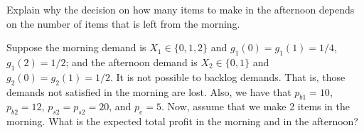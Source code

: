 \begin{exercise}
Explain why the decision on how many items to make in the afternoon depends on the number of items that is left from the morning. 

\end{exercise}


\begin{exercise}
Suppose the morning demand is $X_1\in \{0,1,2\}$ and $g_1(0)=g_1(1)=1/4$, $g_1(2)=1/2$; and the afternoon demand is $X_2\in \{0,1\}$ and $g_2(0)=g_2(1)=1/2$. It is not possible to backlog demands. That is, those demands not satisfied in the morning are lost. Also, we have that $p_{b1}=10$, $p_{b2}=12$, $p_{s2}=p_{s2}=20$, and $p_e=5$. Now, assume that we make 2 items in the morning. What is the expected total profit in the morning and in the afternoon?

\end{exercise}

